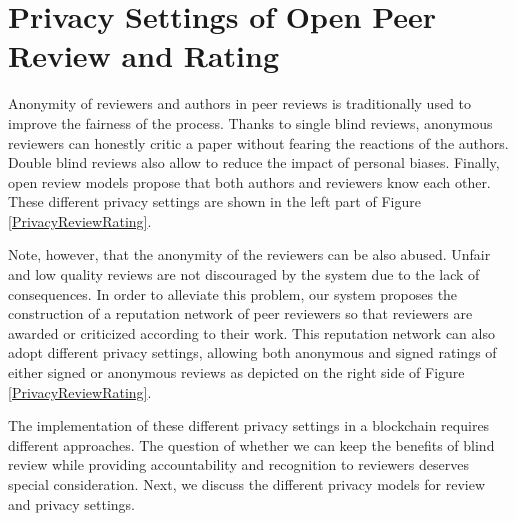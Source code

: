 \section{Privacy Settings of Open Peer Review and Rating}
\label{privacy}
Anonymity of reviewers and authors in peer reviews is traditionally used to
improve the fairness of the process. Thanks to single blind reviews, anonymous
reviewers can honestly critic a paper without fearing the reactions of the
authors. Double blind reviews also allow to reduce the impact of personal
biases. Finally, open review models propose that both authors and reviewers know
each other. These different privacy settings are shown in the left part of
Figure \ref{PrivacyReviewRating}.


Note, however, that the anonymity of the reviewers can be also abused. Unfair
and low quality reviews are not discouraged by the system due to the lack of
consequences. In order to alleviate this problem, our system proposes the
construction of a reputation network of peer reviewers so that reviewers are
awarded or criticized according to their work. This reputation network can also
adopt different privacy settings, allowing both anonymous and signed ratings of
either signed or anonymous reviews as depicted on the right side of Figure
\ref{PrivacyReviewRating}.

The implementation of these different privacy settings in a blockchain requires
different approaches. The question of whether we can keep the benefits of blind
review while providing accountability and recognition to reviewers deserves
special consideration. Next, we discuss the different privacy models for review
and privacy settings.



